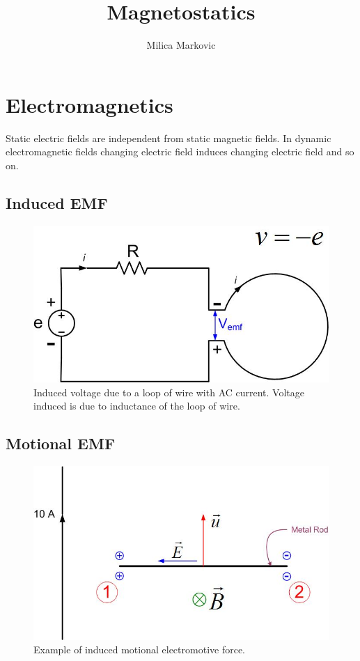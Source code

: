\documentclass{ximera}
\title{Magnetostatics}
\author{Milica Markovic}
\begin{document}
  
\begin{abstract}  

\end{abstract}  
\maketitle    


\section{Electromagnetics}

 Static electric fields are independent from static magnetic fields. In dynamic electromagnetic fields changing electric field induces changing electric field and so on. 



\subsection{Induced EMF}




\begin{figure}[htbp]
\begin{center}
\includegraphics[scale=0.5]{../jpg/inducedvoltage.jpg}
\end{center}
\caption{Induced voltage due to a loop of wire with AC current. Voltage induced is due to inductance of the loop of wire.}
\label{inducedemf}
\end{figure}




\subsection{Motional EMF}


\begin{figure}[htbp]
\begin{center}
\includegraphics[scale=0.5]{../jpg/motionalemf.jpg}
\end{center}
\caption{Example of induced motional electromotive force.}
\label{inducedemf}
\end{figure}
\end{document}
